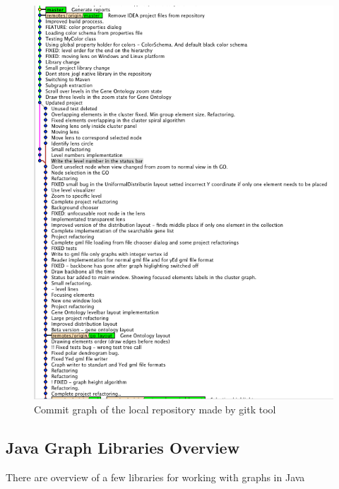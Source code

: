 \begin{figure}[h!]
\centering
\includegraphics[scale=0.6]{pictures/commit_graph_gitk.png}
\caption{Commit graph of the local repository made by gitk tool}
\end{figure}


\subsection{Java Graph Libraries Overview}


There are overview of a few libraries for working with graphs in Java


